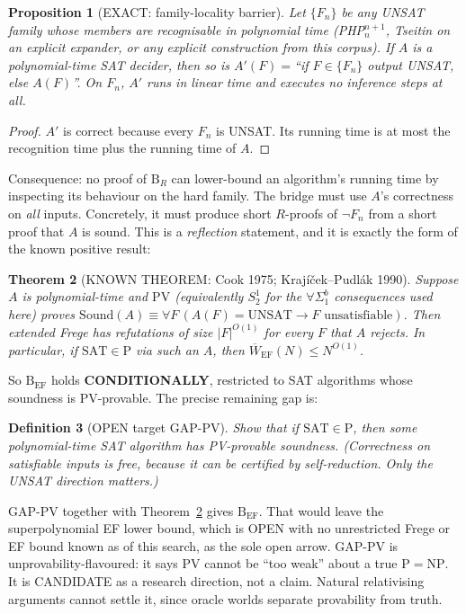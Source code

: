 \documentclass[11pt]{article}
\newtheorem{theorem}{Theorem}\newtheorem{proposition}[theorem]{Proposition}
\newtheorem{definition}[theorem]{Definition}\newtheorem{remark}[theorem]{Remark}
\begin{document}
\begin{proposition}[EXACT: family-locality barrier]\label{prop:local}
Let $\{F_n\}$ be any UNSAT family whose members are recognisable in polynomial time
(PHP$^{n+1}_n$, Tseitin on an explicit expander, or any explicit construction from this
corpus). If $A$ is a polynomial-time SAT decider, then so is
$A'(F)=$``if $F\in\{F_n\}$ output UNSAT, else $A(F)$''. On $F_n$, $A'$ runs in linear time
and executes no inference steps at all.
\end{proposition}
\begin{proof}
$A'$ is correct because every $F_n$ is UNSAT. Its running time is at most the
recognition time plus the running time of $A$.
\end{proof}
Consequence: no proof of $\mathrm B_R$ can lower-bound an algorithm's running time by
inspecting its behaviour on the hard family. The bridge must use $A$'s correctness on
\emph{all} inputs. Concretely, it must produce short $R$-proofs of $\neg F_n$ from a short
proof that $A$ is sound. This is a \emph{reflection} statement, and it is exactly the form
of the known positive result:

\begin{theorem}[KNOWN THEOREM: Cook 1975; Krajíček--Pudlák 1990]\label{thm:pv}
Suppose $A$ is polynomial-time and $\mathrm{PV}$ (equivalently $S^1_2$ for the
$\forall\Sigma^b_1$ consequences used here) proves
$\mathrm{Sound}(A)\equiv\forall F\,(A(F)=\mathrm{UNSAT}\to F\text{ unsatisfiable})$. Then
extended Frege has refutations of size $|F|^{O(1)}$ for every $F$ that $A$ rejects. In
particular, if $\mathrm{SAT}\in\mathrm P$ via such an $A$, then
$\overline W_{\mathrm{EF}}(N)\le N^{O(1)}$.
\end{theorem}
So $\mathrm B_{\mathrm{EF}}$ holds \textbf{CONDITIONALLY}, restricted to SAT algorithms
whose soundness is PV-provable. The precise remaining gap is:

\begin{definition}[OPEN target GAP-PV]
Show that if $\mathrm{SAT}\in\mathrm P$, then some polynomial-time SAT algorithm has
PV-provable soundness. (Correctness on satisfiable inputs is free, because it can be
certified by self-reduction. Only the UNSAT direction matters.)
\end{definition}
GAP-PV together with Theorem~\ref{thm:pv} gives $\mathrm B_{\mathrm{EF}}$. That would leave
the superpolynomial EF lower bound, which is OPEN with no unrestricted Frege or EF bound
known as of this search, as the sole open arrow. GAP-PV is unprovability-flavoured: it says
PV cannot be ``too weak'' about a true $\mathrm{P}=\mathrm{NP}$. It is CANDIDATE as a
research direction, not a claim. Natural relativising arguments cannot settle it, since
oracle worlds separate provability from truth.
\end{document}
